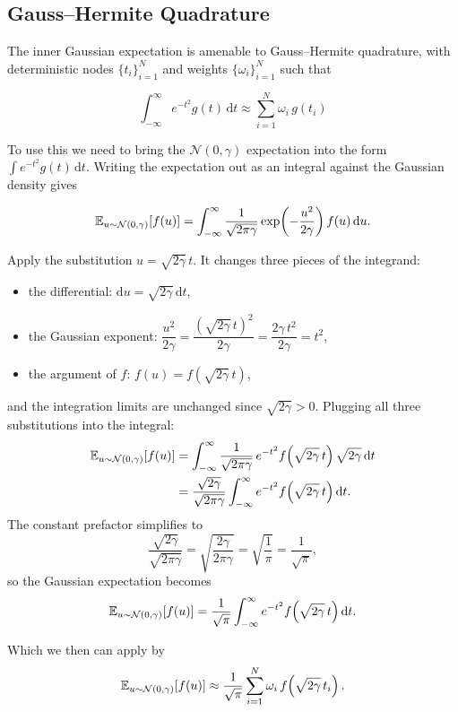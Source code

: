 \subsection{Gauss--Hermite Quadrature}
The inner Gaussian expectation is amenable to Gauss--Hermite quadrature, with
deterministic nodes $\{t_i\}_{i=1}^{N}$ and weights $\{\omega_i\}_{i=1}^{N}$
such that

\[
  \int_{-\infty}^{\infty} e^{-t^2} g(t) \, \mathrm{d}t \approx \sum_{i=1}^{N} \omega_i \, g(t_i)
\]

To use this we need to bring the $\mathcal{N}(0, \gamma)$
expectation into the form $\int e^{-t^2} g(t)\,\mathrm{d}t$. Writing the
expectation out as an integral against the Gaussian density gives

\[
  \mathbb{E}_{u \sim \mathcal{N}(0, \gamma)}[f(u)]
  = \int_{-\infty}^{\infty} \frac{1}{\sqrt{2\pi\gamma}} \exp \!\left(-\frac{u^2}{2\gamma}\right) f(u) \, \mathrm{d}u.
\]

Apply the substitution $u = \sqrt{2\gamma}\,t$. It changes three pieces of
the integrand:
\begin{itemize}
  \item the differential: $\mathrm{d}u = \sqrt{2\gamma}\,\mathrm{d}t$,
  \item the Gaussian exponent: $\dfrac{u^2}{2\gamma} = \dfrac{(\sqrt{2\gamma}\,t)^2}{2\gamma} = \dfrac{2\gamma\, t^2}{2\gamma} = t^2$,
  \item the argument of $f$: $f(u) = f \!\left(\sqrt{2\gamma}\,t\right)$,
\end{itemize}
and the integration limits are unchanged since $\sqrt{2\gamma} > 0$. Plugging
all three substitutions into the integral:
\begin{align*}
  \mathbb{E}_{u \sim \mathcal{N}(0, \gamma)}[f(u)]
  &= \int_{-\infty}^{\infty} \frac{1}{\sqrt{2\pi\gamma}} \, e^{-t^2} f \!\left(\sqrt{2\gamma}\,t\right) \sqrt{2\gamma} \, \mathrm{d}t \\
  &= \frac{\sqrt{2\gamma}}{\sqrt{2\pi\gamma}} \int_{-\infty}^{\infty} e^{-t^2} f \!\left(\sqrt{2\gamma}\,t\right) \mathrm{d}t.
\end{align*}
The constant prefactor simplifies to
\[
  \frac{\sqrt{2\gamma}}{\sqrt{2\pi\gamma}}
  = \sqrt{\frac{2\gamma}{2\pi\gamma}}
  = \sqrt{\frac{1}{\pi}}
  = \frac{1}{\sqrt{\pi}},
\]
so the Gaussian expectation becomes
\[
  \mathbb{E}_{u \sim \mathcal{N}(0, \gamma)}[f(u)]
  = \frac{1}{\sqrt{\pi}} \int_{-\infty}^{\infty} e^{-t^2} f \!\left(\sqrt{2\gamma}\,t\right) \mathrm{d}t.
\]

Which we then can apply by
\[
  \mathbb{E}_{u \sim \mathcal{N}(0, \gamma)}[f(u)]
  \approx \frac{1}{\sqrt{\pi}} \sum_{i=1}^{N} \omega_i\, f \!\left(\sqrt{2\gamma}\,t_i\right).
\]

